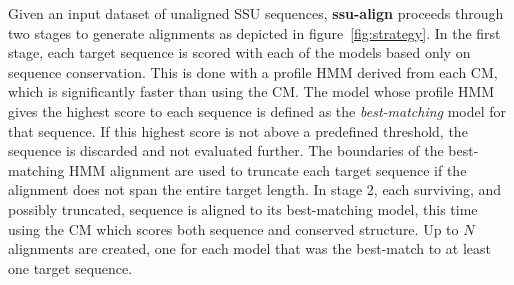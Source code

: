 Given an input dataset of unaligned SSU sequences, \textbf{ssu-align}
proceeds through two stages to generate alignments as depicted in
figure~\ref{fig:strategy}.  
In the first stage, each target sequence is scored with each of the
models based only on sequence conservation. This is done with a
profile HMM derived from each CM, which is significantly faster than
using the CM\@.  The model whose profile HMM gives the highest score to
each sequence is defined as the \emph{best-matching} model for that
sequence. If this highest score is not above a predefined threshold,
the sequence is discarded and not evaluated further. The boundaries of
the best-matching HMM alignment are used to truncate each target
sequence if the alignment does not span the entire target length.  In
stage 2, each surviving, and possibly truncated, sequence is aligned
to its best-matching model, this time using the CM which scores
both sequence and conserved structure. Up to $N$ alignments are
created, one for each model that was the best-match to at least one
target sequence.

